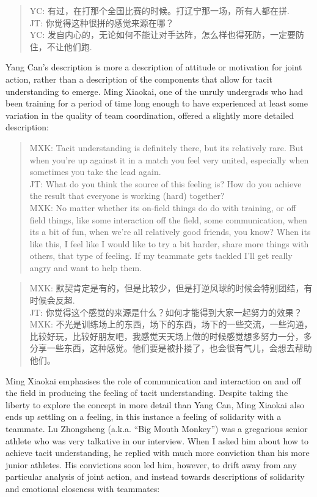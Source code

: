\begin{CJK}{UTF8}{gbsn}
    \begin{quotation}
      YC: 有过，在打那个全国比赛的时候。打辽宁那一场，所有人都在拼.\\
      JT: 你觉得这种很拼的感觉来源在哪？\\
      YC: 发自内心的，无论如何不能让对手达阵，怎么样也得死防，一定要防住，不让他们跑.
    \end{quotation}

Yang Can's description is more a description of attitude or motivation for joint action, rather than a description of the components that allow for tacit understanding to emerge.  Ming Xiaokai, one of the unruly undergrads who had been training for a period of time long enough to have experienced at least some variation in the quality of team coordination, offered a slightly more detailed description:

    \begin{quotation}
        MXK: Tacit understanding is definitely there, but its relatively rare. But when you’re up against it in a match you feel very united, especially when sometimes you take the lead again. \\
        JT: What do you think the source of this feeling is?  How do you achieve the result that everyone is working (hard) together? \\
        MXK: No matter whether its on-field things do do with training, or off field things, like some interaction off the field, some communication, when its a bit of fun, when we're all relatively good friends, you know?  When its like this, I feel like I would like to try a bit harder, share more things with others, that type of feeling.  If my teammate gets tackled I'll get really angry and want to help them.
    \end{quotation}

    \begin{quotation}
        MXK: 默契肯定是有的，但是比较少，但是打逆风球的时候会特别团结，有时候会反超. \\
        JT: 你觉得这个感觉的来源是什么？如何才能得到大家一起努力的效果？ \\
        MXK: 不光是训练场上的东西，场下的东西，场下的一些交流，一些沟通，比较好玩，比较好朋友吧，我感觉天天场上做的时候感觉想多努力一分，多分享一些东西，这种感觉。他们要是被扑搂了，也会很有气儿，会想去帮助他们。 
    \end{quotation}

Ming Xiaokai emphasises the role of communication and interaction on and off the field in producing the feeling of tacit understanding.  Despite taking the liberty to explore the concept in more detail than Yang Can, Ming Xiaokai also ends up settling on a feeling, in this instance a feeling of solidarity with a teammate.  Lu Zhongsheng (a.k.a. ``Big Mouth Monkey'') was a gregarious senior athlete who was very talkative in our interview.  When I asked him about how to achieve tacit understanding, he replied with much more conviction than his more junior athletes.  His convictions soon led him, however, to drift away from any particular analysis of joint action, and instead towards descriptions of solidarity and emotional closeness with teammates:


\end{CJK}
